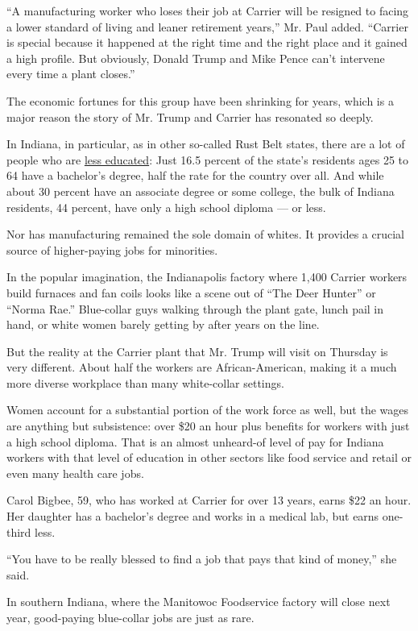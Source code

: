 ``A manufacturing worker who loses their job at Carrier will be resigned
to facing a lower standard of living and leaner retirement years,'' Mr.
Paul added. ``Carrier is special because it happened at the right time
and the right place and it gained a high profile. But obviously, Donald
Trump and Mike Pence can't intervene every time a plant closes.''

The economic fortunes for this group have been shrinking for years,
which is a major reason the story of Mr. Trump and Carrier has resonated
so deeply.

In Indiana, in particular, as in other so-called Rust Belt states, there
are a lot of people who are
\href{https://www.in.gov/che/files/IN_-_A_Stronger_Nation.pdf}{less
educated}: Just 16.5 percent of the state's residents ages 25 to 64 have
a bachelor's degree, half the rate for the country over all. And while
about 30 percent have an associate degree or some college, the bulk of
Indiana residents, 44 percent, have only a high school diploma --- or
less.

Nor has manufacturing remained the sole domain of whites. It provides a
crucial source of higher-paying jobs for minorities.

In the popular imagination, the Indianapolis factory where 1,400 Carrier
workers build furnaces and fan coils looks like a scene out of ``The
Deer Hunter'' or ``Norma Rae.'' Blue-collar guys walking through the
plant gate, lunch pail in hand, or white women barely getting by after
years on the line.

But the reality at the Carrier plant that Mr. Trump will visit on
Thursday is very different. About half the workers are African-American,
making it a much more diverse workplace than many white-collar settings.

Women account for a substantial portion of the work force as well, but
the wages are anything but subsistence: over \$20 an hour plus benefits
for workers with just a high school diploma. That is an almost
unheard-of level of pay for Indiana workers with that level of education
in other sectors like food service and retail or even many health care
jobs.

Carol Bigbee, 59, who has worked at Carrier for over 13 years, earns
\$22 an hour. Her daughter has a bachelor's degree and works in a
medical lab, but earns one-third less.

``You have to be really blessed to find a job that pays that kind of
money,'' she said.

In southern Indiana, where the Manitowoc Foodservice factory will close
next year, good-paying blue-collar jobs are just as rare.

